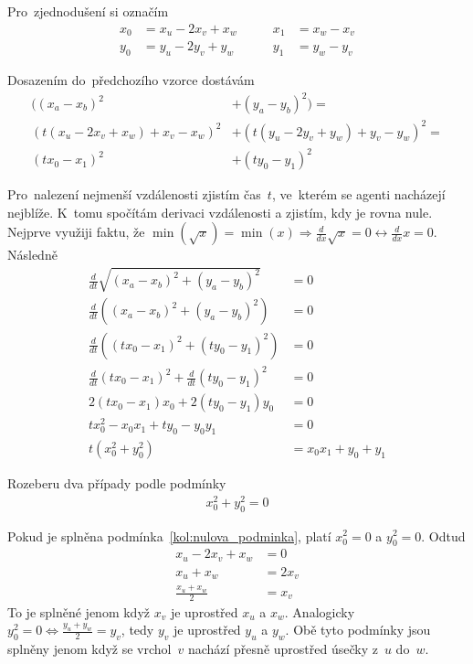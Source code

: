 Pro~zjednodušení si označím
\begin{align*}
  x_0 &= x_u - 2x_v + x_w &\qquad
  x_1 &= x_w - x_v \\
  y_0 &= y_u - 2y_v + y_w &\qquad
  y_1 &= y_w - y_v
\end{align*}

Dosazením do~předchozího vzorce dostávám
\begin{align*}
  ((x_a - x_b)^2 &+ (y_a - y_b)^2) = \\
  (t(x_u - 2x_v + x_w) + x_v - x_w)^2 &+ (t(y_u - 2y_v + y_w) + y_v - y_w)^2 = \\
  (tx_0 - x_1)^2 &+ (ty_0 - y_1)^2
\end{align*}

Pro~nalezení nejmenší vzdálenosti zjistím čas~$t$, ve~kterém se agenti nacházejí nejblíže.
K~tomu spočítám derivaci vzdálenosti a zjistím, kdy je rovna nule.
Nejprve využiji faktu, že $\min\left(\sqrt{x}\right) = \min(x) \Rightarrow \frac{d}{dx} \sqrt {x} = 0 \leftrightarrow \frac{d}{dx} x=0$.
Následně
\begin{align}
  \frac{d}{dt} \sqrt{(x_a - x_b)^2 + (y_a - y_b)^2} &= 0 \nonumber \\
  \frac{d}{dt} ((x_a - x_b)^2 + (y_a - y_b)^2) &= 0 \nonumber \\
  \frac{d}{dt} ((tx_0 - x_1)^2 + (ty_0 - y_1)^2) &= 0 \nonumber \\
  \frac{d}{dt} (tx_0 - x_1)^2 + \frac{d}{dt} (ty_0 - y_1)^2 &= 0 \nonumber \\
  2(tx_0 - x_1)x_0 + 2(ty_0 - y_1)y_0 &= 0 \nonumber \\
  tx_0^2 - x_0 x_1 + ty_0 - y_0 y_1 &= 0 \nonumber \\
  t(x_0^2 + y_0^2) &= x_0 x_1 + y_0 + y_1 \label{eq:kol_d_dt}
\end{align}

Rozeberu dva případy podle podmínky
\begin{gather}
  x_0^2 + y_0^2 = 0\label{kol:nulova_podminka}
\end{gather}

Pokud je splněna podmínka~\ref{kol:nulova_podminka}, platí $x_0^2 = 0$ a $y_0^2 = 0$.
Odtud
\begin{align*}
  x_u - 2 x_v + x_w &= 0 \\
  x_u + x_w &= 2 x_v \\
  \frac{x_u + x_w}{2} &= x_v
\end{align*}
To je splněné jenom když $x_v$ je uprostřed $x_u$ a $x_w$.
Analogicky $y_0^2 = 0 \Leftrightarrow \frac{y_u + y_w}{2} = y_v$, tedy $y_v$ je uprostřed $y_u$ a $y_w$.
Obě tyto podmínky jsou splněny jenom když se vrchol~$v$ nachází přesně uprostřed úsečky z~$u$ do~$w$.

